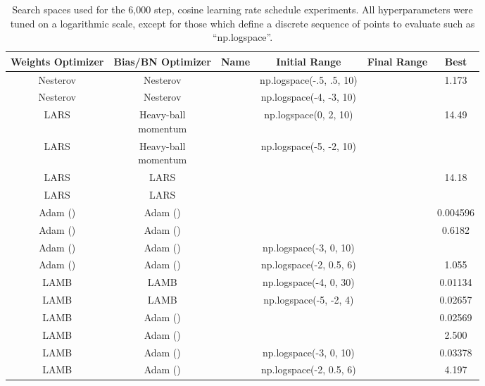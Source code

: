 \documentclass{article}
\begin{document}
\begin{table*}[t]
\centering
\setlength{\extrarowheight}{3.5pt}
\begin{tabular}{|c|c|c|c|c|c|}
\hline
Weights Optimizer & Bias/BN Optimizer & Name & Initial Range & Final Range & Best \\ \hline
Nesterov & Nesterov &  & np.logspace(-.5, .5, 10) &  & 1.173 \\ \hline
Nesterov & Nesterov &  & np.logspace(-4, -3, 10) &  &  \\ \hhline{|=|=|=|=|=|=|}
LARS & \specialcell{Heavy-ball\\momentum} &  & np.logspace(0, 2, 10) &  & 14.49 \\ \hline
LARS & \specialcell{Heavy-ball\\momentum} &  & np.logspace(-5, -2, 10) &  &  \\ \hhline{|=|=|=|=|=|=|}
LARS & LARS &  &  &  & 14.18 \\ \hline
LARS & LARS &  &  &  &  \\ \hhline{|=|=|=|=|=|=|}
Adam () & Adam () &  &  &  & 0.004596 \\ \hline
Adam () & Adam () &  &  &  & 0.6182 \\ \hhline{|=|=|=|=|=|=|}
Adam () & Adam () &  & np.logspace(-3, 0, 10) &  &  \\ \hline
Adam () & Adam () &  & np.logspace(-2, 0.5, 6) &  & 1.055 \\ \hhline{|=|=|=|=|=|=|}
LAMB & LAMB &  & np.logspace(-4, 0, 30) &  & 0.01134 \\ \hline
LAMB & LAMB &  & np.logspace(-5, -2, 4) &  & 0.02657 \\ \hhline{|=|=|=|=|=|=|}
LAMB & Adam () &  &  &  & 0.02569 \\ \hline
LAMB & Adam () &  &  &  & 2.500 \\ \hhline{|=|=|=|=|=|=|}
LAMB & Adam () &  & np.logspace(-3, 0, 10) &  & 0.03378 \\ \hline
LAMB & Adam () &  & np.logspace(-2, 0.5, 6) &  & 4.197 \\ \hline
\end{tabular}
\caption{Search spaces used for the 6,000 step, cosine learning rate schedule experiments. All hyperparameters were tuned on a logarithmic scale, except for those which define a discrete sequence of points to evaluate such as ``np.logspace''.}
\label{table:cosine_hparam_tunings}
\end{table*}
\end{document}
